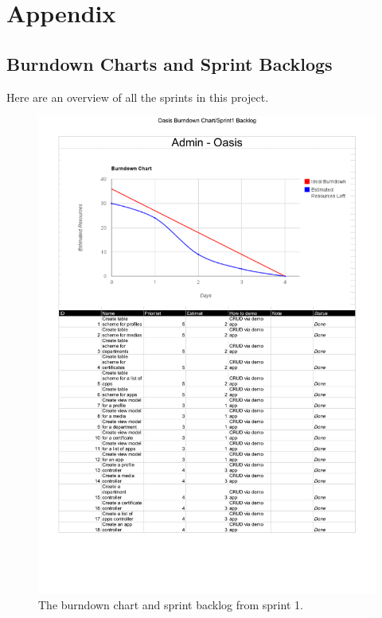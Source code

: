 \chapter*{Appendix}

\section{Burndown Charts and Sprint Backlogs}
\label{sec:burn_back}
Here are an overview of all the sprints in this project.
	
\begin{figure}[htbp]
	\centering
		\includegraphics[width=\textwidth]{Images/sprint_backlogs/Oasis_Burndown_Chart_-_Sprint1_Backlog}
	\caption{The burndown chart and sprint backlog from sprint 1.}
	\label{fig:sprint1}
\end{figure}

